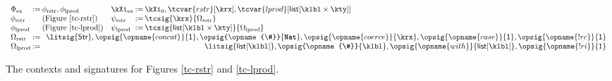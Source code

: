 %
\begin{figure}
\small
\hspace{-5px}$\begin{array}{l@{\hspace{2px}}c@{\hspace{2px}}l@{\hspace{10px}}l@{\hspace{2px}}c@{\hspace{2px}}l}
\Phi_\text{ex} & := & \phi_\text{rstr}, \phi_\text{lprod} & \kXi_\text{ex} & := &\kXi_0, \tcvar{rstr}[\krx], \tcvar{lprod}[\klist{\klbl\times\kty}]\\
\phi_\text{rstr} & & \text{\normalsize(Figure \ref{tc-rstr})} & \psi_\text{rstr} & := &\tcsig{\krx}{\Omega_\text{rstr}}\\
\phi_\text{lprod}& &\text{\normalsize(Figure \ref{tc-lprod})} & \psi_\text{lprod} &:=& \tcsig{\klist{\klbl \times \kty}}{\Omega_\text{lprod}}\\
\Omega_\text{rstr} & := & \multicolumn{4}{r}{\litsig{\kstr}, \opsig{\opname{concat}}{\kunit}, \opsig{\opname{\#}}{\keyw{Nat}}, \opsig{\opname{coerce}}{\krx}, \opsig{\opname{case}}{\kunit}, \opsig{\opname{!rc}}{\kunit}}\\
\Omega_\text{lprod} & := & \multicolumn{4}{r}{\litsig{\klist{\klbl}}, \opsig{\opname{\#}}{\klbl}, \opsig{\opname{with}}{\klist{\klbl}}, \opsig{\opname{!ri}}{\kunit}}
\end{array}$
\caption{The contexts and signatures for Figures \ref{tc-rstr} and \ref{tc-lprod}.}
\label{example-tcsigs}
\end{figure}


